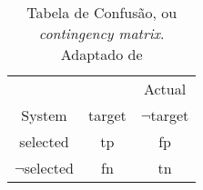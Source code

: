 \begin{table}[!h]
    \centering
    \begin{tabular}{c|c c}
                    &       &   Actual\\
        System      & target &  $\neg$target\\
        \hline
        selected    & tp & fp \\
        $\neg$selected   & fn & tn 
    \end{tabular}
    \caption[Tabela de Confusão]{Tabela de Confusão, ou \textit{contingency matrix}. Adaptado de  }
    \label{tab:tab_confusao}
\end{table}